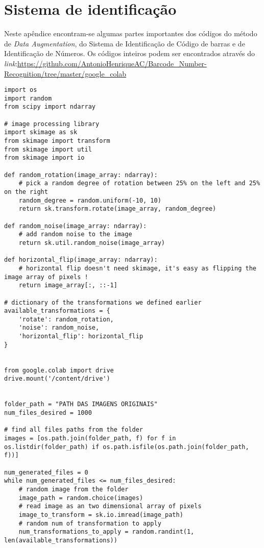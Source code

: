 \chapter{Sistema de identificação} \label{ap:ident}

Neste apêndice encontram-se algumas partes importantes dos códigos do método de \textit{Data Augmentation}, do Sistema de Identificação de Código de barras e de Identificação de Números. Os códigos inteiros podem ser encontrados através do \textit{link}:\url{https://github.com/AntonioHenriqueAC/Barcode_Number-Recognition/tree/master/google_colab}
\newline

\begin{lstlisting}[caption=Método de \textit{Data augmentation}]
import os
import random
from scipy import ndarray

# image processing library
import skimage as sk
from skimage import transform
from skimage import util
from skimage import io

def random_rotation(image_array: ndarray):
    # pick a random degree of rotation between 25% on the left and 25% on the right
    random_degree = random.uniform(-10, 10)
    return sk.transform.rotate(image_array, random_degree)

def random_noise(image_array: ndarray):
    # add random noise to the image
    return sk.util.random_noise(image_array)

def horizontal_flip(image_array: ndarray):
    # horizontal flip doesn't need skimage, it's easy as flipping the image array of pixels !
    return image_array[:, ::-1]

# dictionary of the transformations we defined earlier
available_transformations = {
    'rotate': random_rotation,
    'noise': random_noise,
    'horizontal_flip': horizontal_flip
}


from google.colab import drive
drive.mount('/content/drive')


folder_path = "PATH DAS IMAGENS ORIGINAIS"
num_files_desired = 1000

# find all files paths from the folder
images = [os.path.join(folder_path, f) for f in os.listdir(folder_path) if os.path.isfile(os.path.join(folder_path, f))]

num_generated_files = 0
while num_generated_files <= num_files_desired:
    # random image from the folder
    image_path = random.choice(images)
    # read image as an two dimensional array of pixels
    image_to_transform = sk.io.imread(image_path)
    # random num of transformation to apply
    num_transformations_to_apply = random.randint(1, len(available_transformations))


\end{lstlisting}
